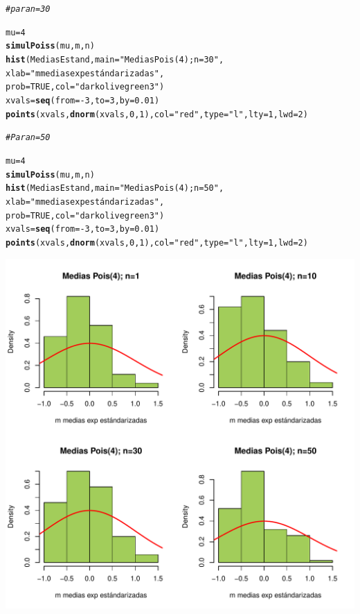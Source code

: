 \documentclass[12pt,letterpaper]{article}\usepackage[]{graphicx}\usepackage[]{color}
\makeatletter
\def\maxwidth{ %
  \ifdim\Gin@nat@width>\linewidth
    \linewidth
  \else
    \Gin@nat@width
  \fi
}
\newcommand{\hlnum}[1]{\textcolor[rgb]{0.686,0.059,0.569}{#1}}%
\newcommand{\hlstr}[1]{\textcolor[rgb]{0.192,0.494,0.8}{#1}}%
\newcommand{\hlcom}[1]{\textcolor[rgb]{0.678,0.584,0.686}{\textit{#1}}}%
\newcommand{\hlopt}[1]{\textcolor[rgb]{0,0,0}{#1}}%
\newcommand{\hlstd}[1]{\textcolor[rgb]{0.345,0.345,0.345}{#1}}%
\newcommand{\hlkwb}[1]{\textcolor[rgb]{0.69,0.353,0.396}{#1}}%
\newcommand{\hlkwc}[1]{\textcolor[rgb]{0.333,0.667,0.333}{#1}}%
\newcommand{\hlkwd}[1]{\textcolor[rgb]{0.737,0.353,0.396}{\textbf{#1}}}%
\newenvironment{kframe}{%
 \def\at@end@of@kframe{}%
 \ifinner\ifhmode%
  \def\at@end@of@kframe{\end{minipage}}%
  \begin{minipage}{\columnwidth}%
 \fi\fi%
 \def\FrameCommand##1{\hskip\@totalleftmargin \hskip-\fboxsep
 \colorbox{shadecolor}{##1}\hskip-\fboxsep
     \hskip-\linewidth \hskip-\@totalleftmargin \hskip\columnwidth}%
 \MakeFramed {\advance\hsize-\width
   \@totalleftmargin\z@ \linewidth\hsize
   \@setminipage}}%
 {\par\unskip\endMakeFramed%
 \at@end@of@kframe}
\newenvironment{knitrout}{}{} %
\makeatother
\begin{document}
\begin{enumerate}
\begin{knitrout}
\begin{kframe}
\begin{alltt}
\hlcom{# para n=30 }

\hlstd{mu}\hlkwb{=}\hlnum{4}
\hlkwd{simulPoiss}\hlstd{(mu, m, n)}
\hlkwd{hist}\hlstd{(MediasEstand,} \hlkwc{main}\hlstd{=}\hlstr{"Medias Pois(4); n=30"}\hlstd{,}
     \hlkwc{xlab}\hlstd{=}\hlstr{"m medias exp estándarizadas"}\hlstd{,}
\hlkwc{prob}\hlstd{=}\hlnum{TRUE}\hlstd{,} \hlkwc{col}\hlstd{=}\hlstr{"darkolivegreen3"}\hlstd{)}
\hlstd{xvals} \hlkwb{=} \hlkwd{seq}\hlstd{(}\hlkwc{from}\hlstd{=}\hlopt{-}\hlnum{3}\hlstd{,} \hlkwc{to}\hlstd{=}\hlnum{3}\hlstd{,} \hlkwc{by}\hlstd{=}\hlnum{0.01}\hlstd{)}
\hlkwd{points}\hlstd{(xvals,} \hlkwd{dnorm}\hlstd{(xvals,} \hlnum{0}\hlstd{,} \hlnum{1}\hlstd{),} \hlkwc{col} \hlstd{=} \hlstr{"red"}\hlstd{,} \hlkwc{type}\hlstd{=}\hlstr{"l"}\hlstd{,} \hlkwc{lty}\hlstd{=}\hlnum{1}\hlstd{,} \hlkwc{lwd}\hlstd{=}\hlnum{2}\hlstd{)}

\hlcom{# Para n=50}

\hlstd{mu}\hlkwb{=}\hlnum{4}
\hlkwd{simulPoiss}\hlstd{(mu, m, n)}
\hlkwd{hist}\hlstd{(MediasEstand,} \hlkwc{main}\hlstd{=}\hlstr{"Medias Pois(4); n=50"}\hlstd{,}
     \hlkwc{xlab}\hlstd{=}\hlstr{"m medias exp estándarizadas"}\hlstd{,}
\hlkwc{prob}\hlstd{=}\hlnum{TRUE}\hlstd{,} \hlkwc{col}\hlstd{=}\hlstr{"darkolivegreen3"}\hlstd{)}
\hlstd{xvals} \hlkwb{=} \hlkwd{seq}\hlstd{(}\hlkwc{from}\hlstd{=}\hlopt{-}\hlnum{3}\hlstd{,} \hlkwc{to}\hlstd{=}\hlnum{3}\hlstd{,} \hlkwc{by}\hlstd{=}\hlnum{0.01}\hlstd{)}
\hlkwd{points}\hlstd{(xvals,} \hlkwd{dnorm}\hlstd{(xvals,} \hlnum{0}\hlstd{,} \hlnum{1}\hlstd{),} \hlkwc{col} \hlstd{=} \hlstr{"red"}\hlstd{,} \hlkwc{type}\hlstd{=}\hlstr{"l"}\hlstd{,} \hlkwc{lty}\hlstd{=}\hlnum{1}\hlstd{,} \hlkwc{lwd}\hlstd{=}\hlnum{2}\hlstd{)}
\end{alltt}
\end{kframe}
\includegraphics[width=\maxwidth]{figure/unnamed-chunk-7-1} 

\end{knitrout}




\end{enumerate}
\end{document}
